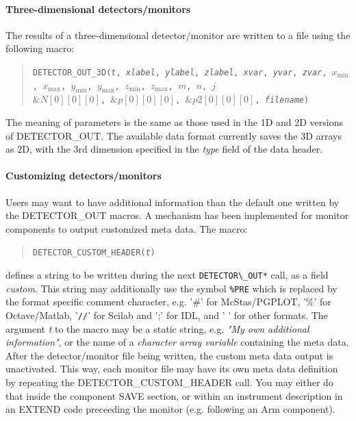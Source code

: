 \paragraph{Three-dimensional detectors/monitors}

The results of a three-dimensional detector/\discretionary{}{}{}mon\-i\-tor are written to a file using the
following macro:

\begin{quote}
  \texttt{DETECTOR\_OUT\_3D(\textit{t},
        \textit{xlabel}, \textit{ylabel}, \textit{zlabel},
        \textit{xvar}, \textit{yvar}, \textit{zvar},
        $x_\mathrm{min}$, $x_\mathrm{max}$, $y_\mathrm{min}$, $y_\mathrm{max}$,
        $z_\mathrm{min}$, $z_\mathrm{max}$, $m$, $n$, $j$\\
          $\&N[0][0][0]$, $\&p[0][0][0]$, $\&\textit{p2}[0][0][0]$,
        \textit{filename})}
\end{quote}
The meaning of parameters is the same as those used in the 1D and 2D
versions of DETECTOR\_OUT. The available data format currently saves
the 3D arrays as 2D, with the 3rd dimension specified in the \textit{
  type} field of the data header.

\paragraph{Customizing detectors/monitors}

Users may want to have additional information than the default one written by the DETECTOR\_OUT macros. A mechanism has been implemented for monitor components to output customized meta data. The macro:

\begin{quote}
  \texttt{DETECTOR\_CUSTOM\_HEADER(\textit{t})}
\end{quote}

defines a string to be written during the next \verb+DETECTOR\_OUT*+ call, as a field \textit{custom}. This string may additionally use the symbol \verb+%PRE+ which is replaced by the format specific comment character, e.g. '\#' for McStas/PGPLOT, '\%' for Octave/Matlab, '\verb+//+' for Scilab and ';' for IDL, and ' ' for other formats. The argument \textit{t} to the macro may be a static string, e.g. \textit{"My own additional information"}, or the name of a \textit{character array variable} containing the meta data. After the detector/monitor file being written, the custom meta data output is unactivated. This way, each monitor file may have its own meta data definition by repeating the DETECTOR\_CUSTOM\_HEADER call. You may either do that inside the component SAVE section, or within an instrument description in an EXTEND code preceeding the monitor (e.g. following an Arm component).

